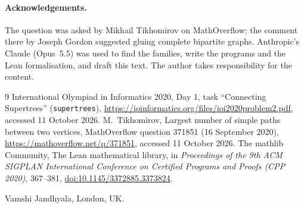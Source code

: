 \documentclass[11pt]{article}
\theoremstyle{remark}
\begin{document}
\paragraph{Acknowledgements.} The question was asked by Mikhail Tikhomirov on MathOverflow; the comment there by
Joseph Gordon suggested gluing complete bipartite graphs. Anthropic's Claude (Opus~5.5)
was used to find the families, write the programs and the Lean formalisation, and draft this text. The author
takes responsibility for the content.

\begin{thebibliography}{9}
 International Olympiad in Informatics 2020, Day 1, task ``Connecting Supertrees''
(\texttt{supertrees}), \url{https://ioinformatics.org/files/ioi2020problem2.pdf}, accessed 11 October 2026.
 M.~Tikhomirov, Largest number of simple paths between two vertices, MathOverflow question 371851
(16 September 2020),
\url{https://mathoverflow.net/q/371851}, accessed 11 October 2026.
 The mathlib Community, The Lean mathematical library, in \emph{Proceedings of the 9th ACM
SIGPLAN International Conference on Certified Programs and Proofs (CPP 2020)}, 367--381,
\href{https://doi.org/10.1145/3372885.3373824}{doi:10.1145/3372885.3373824}.
\end{thebibliography}

\bigskip
\noindent Vamshi Jandhyala, London, UK.
\end{document}
